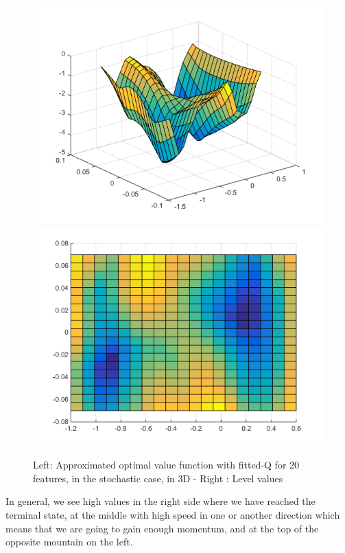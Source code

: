 \documentclass[a4paper, 12pt]{article}
\begin{document}
\begin{figure}[H]
	\centering
	\noindent\includegraphics[scale=0.3]{fittedQ-5ep-5000draws-stochastic.png}
	\noindent\includegraphics[scale=0.3]{fittedQ-5ep-5000draws-stochastic-levels.png}
	\caption{Left: Approximated optimal value function with fitted-Q for 20 features, in the stochastic case, in 3D - Right : Level values}
\end{figure}

In general, we see high values in the right side where we have reached the terminal state, at the middle with high speed in one or another direction which means that we are going to gain enough momentum, and at the top of the opposite mountain on the left.
\end{document}
